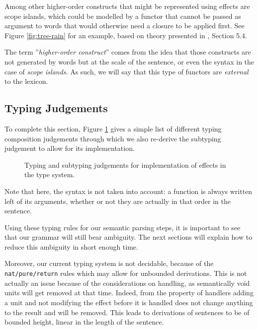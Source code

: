 Among other higher-order constructs that might be represented using effects are
scope islands, which could be modelled by a functor that cannot be
passed as argument to words that would otherwise need a closure to be applied
first.
See Figure \ref{fig:tree-rain} for an example, based on theory presented in
\cite{bumfordEffectdrivenInterpretationFunctors2025}, Section 5.4.

The term ''\emph{higher-order construct}'' comes from the idea that those
constructs are not generated by words but at the scale of the sentence, or even
the syntax in the case of \emph{scope islands}.
As such, we will say that this type of functors are \emph{external} to the
lexicon.

\subsection{Typing Judgements}\label{subsec:judgements}
To complete this section, Figure \ref{tab:judgements} gives a simple list of different typing composition judgements through which we also re-derive the subtyping judgement to allow for its implementation.
\begin{figure}
	
	\caption{Typing and subtyping judgements for implementation of effects in the
		type system.}
	\label{tab:judgements}
\end{figure}
Note that here, the syntax is not taken into account: a function is always written left of its arguments, whether or not they are actually in that order in the sentence.

\smallskip

Using these typing rules for our semantic parsing steps, it is important to
see that our grammar will still bear ambiguity.
The next sections will explain how to reduce this ambiguity in short enough
time.

Moreover, our current typing system is not decidable, because of the
\texttt{nat/pure/return} rules which may allow for unbounded derivations.
This is not actually an issue because of the considerations on handling, as
semantically void units will get removed at that time.
Indeed, from the property of handlers adding a unit and not modifying the
effect before it is handled does not change anything to the result and will be
removed.
This leads to derivations of sentences to be of bounded height, linear in the
length of the sentence.
